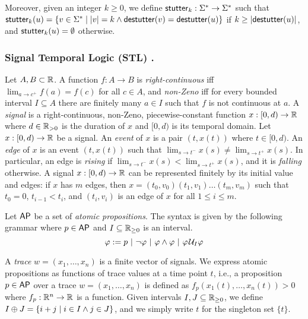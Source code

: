 Moreover, given an integer $k \geq 0$, we define $\mathsf{stutter}_k : \Sigma^* \to \Sigma^*$ such that $\stutter_k(u) = \{v \in \Sigma^* \st |v| = k \land \destutter(v) = \destutter(u)\}$ if $k \geq |\mathsf{destutter}(u)|$, and $\mathsf{stutter}_k(u) = \emptyset$ otherwise.

\subsubsection{Signal Temporal Logic (STL) \cite{MalerN13}.}
Let $A,B \subset \mathbb{R}$.
%
A function $f : A \to B$ is
\emph{right-continuous} iff $\lim_{a \to c^+} f(a) = f(c)$ for all $c \in A$, and
\emph{non-Zeno} iff for every bounded interval $I \subseteq A$ there are finitely many $a \in I$ such that $f$ is not continuous at $a$.
%
A \emph{signal} is a right-continuous, non-Zeno, piecewise-constant function $x : [0,d) \to \mathbb{R}$ where $d \in \mathbb{R}_{> 0}$ is the duration of $x$ and $[0,d)$ is its temporal domain.
Let $x : [0,d) \to \mathbb{R}$ be a signal.
An \emph{event} of $x$ is a pair $(t, x(t))$ where $t \in [0,d)$.
An \emph{edge} of $x$ is an event $(t, x(t))$ such that $\lim_{s \to t^-} x(s) \neq \lim_{s \to t^+} x(s)$.
In particular, an edge is \emph{rising} if $\lim_{s \to t^-} x(s) < \lim_{s \to t^+} x(s)$, and it is \emph{falling} otherwise.
A signal $x : [0,d) \to \mathbb{R}$ can be represented finitely by its initial value and edges: if $x$ has $m$ edges, then $x = (t_0, v_0) (t_1, v_1) \ldots (t_m, v_m)$ such that $t_0 = 0$, $t_{i-1} < t_i$, and $(t_i, v_i)$ is an edge of $x$ for all $1 \leq i \leq m$.

Let $\mathsf{AP}$ be a set of \emph{atomic propositions}.
The syntax is given by the following grammar where $p \in \mathsf{AP}$ and $I \subseteq \mathbb{R}_{\geq 0}$ is an interval.
\[ \varphi :=  p ~|~ \lnot \varphi ~|~ \varphi \land \varphi ~|~ \varphi \kern.1em\mathcal{U}_I \varphi \]

A \emph{trace} $w = (x_1, \ldots, x_n)$ is a finite vector of signals.
We express atomic propositions as functions of trace values at a time point $t$,
i.e., a proposition $p \in \mathsf{AP}$ over a trace $w = (x_1, \ldots, x_n)$ is defined as $f_p(x_1(t), \ldots, x_n(t)) > 0$ where $f_p : \mathbb{R}^n \to \mathbb{R}$ is a function.
Given intervals $I,J \subseteq \mathbb{R}_{\geq 0}$, we define $I \oplus J = \{i + j \st i \in I \land j \in J\}$, and we simply write $t$ for the singleton set $\{t\}$. 

